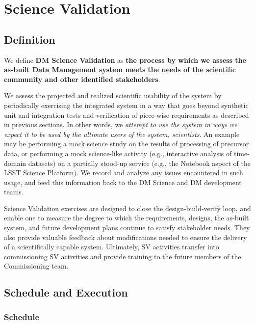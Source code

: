 \section{Science Validation} \label{sect:scival}

\subsection{Definition}

We define  \textbf{DM Science Validation} as \textbf{the process by which we
assess the as-built Data Management system meets the needs of the
scientific community and other identified stakeholders}.

We assess the projected and realized scientific usability of the system by
periodically exercising the integrated system in a way that goes beyond
synthetic unit and integration tests and verification of piece-wise
requirements as described in previous sections.  In other words, we {\em
attempt to use the system in ways we expect it to be used by the ultimate
users of the system, scientists}.  An example may be performing a mock
science study on the results of processing of precursor data, or performing
a mock science-like activity (e.g., interactive analysis of time-domain
datasets) on a partially stood-up service (e.g., the Notebook aspect of the
LSST Science Platform).  We record and analyze any issues encountered in
such usage, and feed this information back to the DM Science and DM
development teams.

Science Validation exercises are designed to close the design-build-verify
loop, and enable one to measure the degree to which the requirements,
designs, the as-built system, and future development plans continue to
satisfy stakeholder needs.  They also provide valuable feedback about
modifications needed to ensure the delivery of a scientifically capable
system.  Ultimately, SV activities transfer into commissioning SV activities
and provide training to the future members of the Commissioning team.


\subsection{Schedule and Execution}

\subsubsection{Schedule}

